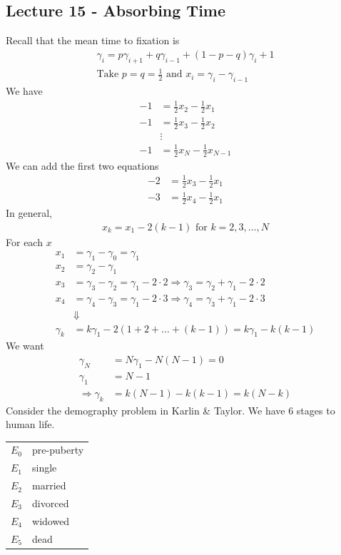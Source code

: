 \documentclass[12pt, letterpaper]{article}
\begin{document}
\subsection{Lecture 15 - Absorbing Time}
Recall that the mean time to fixation is 
\begin{align*}
    \gamma_i = p\gamma_{i+1} + q\gamma_{i-1} + (1-p-q)\gamma_i + 1 \\
    \text{Take }p=q=\frac 12 \text{ and } x_i = \gamma_i-\gamma_{i-1}
\end{align*}
We have 
\begin{align*}
    -1 &= \frac 12 x_2 - \frac 12 x_1 \\
    -1 &= \frac 12 x_3 - \frac 12 x_2 \\
    &\vdots \\
    -1 &= \frac 12 x_N - \frac 12 x_{N-1}
\end{align*}
We can add the first two equations
\begin{align*}
    -2 &= \frac 12 x_3 - \frac 12 x_1 \\
    -3 &= \frac 12 x_4 - \frac 12 x_1
\end{align*}
In general,
\begin{align*}
    x_k = x_1 - 2(k-1) \text{ for } k=2,3,\dots, N
\end{align*}
For each $x$
\begin{align*}
    x_1 &= \gamma_1 - \gamma_0 = \gamma_1 \\
    x_2 &= \gamma_2 - \gamma_1 \\
    x_3 &= \gamma_3 - \gamma_2 = \gamma_1 - 2\cdot 2 \Rightarrow \gamma_3 = \gamma_2 + \gamma_1 -2\cdot 2\\
    x_4 &= \gamma_4 - \gamma_3 = \gamma_1 - 2\cdot 3 \Rightarrow \gamma_4 = \gamma_3 + \gamma_1 -2\cdot 3\\
    &\Downarrow \\
    \gamma_k &= k\gamma_1 - 2(1+2+\dots+(k-1)) = k\gamma_1 - k(k-1)
\end{align*}
We want 
\begin{align*}
    \gamma_N &= N\gamma_1 - N(N-1) = 0 \\
    \gamma_1 &= N-1 \\
    \Rightarrow \gamma_k &= k(N-1)-k(k-1) = k(N-k)
\end{align*}
 Consider the demography problem in Karlin \& Taylor. We have 6 stages to 
human life.
\begin{center}
    \begin{tabular}{c l}
        $E_0$ & pre-puberty \\
        $E_1$ & single \\
        $E_2$ & married \\
        $E_3$ & divorced \\
        $E_4$ & widowed \\
        $E_5$ & dead
    \end{tabular}
\end{center}
\end{document}
